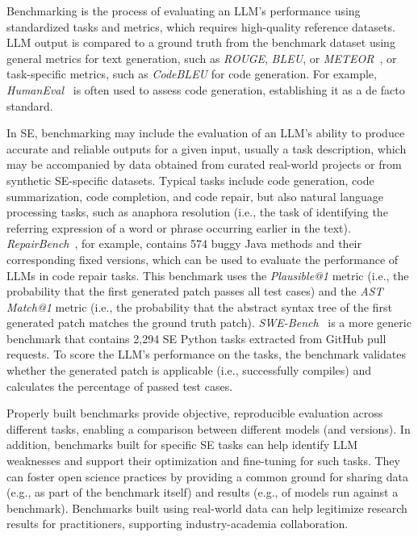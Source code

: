 \label{sec:benchmarking-llms-for-software-engineering-tasks}


Benchmarking is the process of evaluating an LLM's performance using standardized tasks and metrics, which requires high-quality reference datasets.
LLM output is compared to a ground truth from the benchmark dataset using general metrics for text generation, such as \emph{ROUGE}, \emph{BLEU}, or \emph{METEOR}~\cite{10.1145/3695988}, or task-specific metrics, such as \emph{CodeBLEU} for code generation.
For example, \emph{HumanEval}~\cite{DBLP:journals/corr/abs-2107-03374} is often used to assess code generation, establishing it as a de facto standard.


In SE, benchmarking may include the evaluation of an LLM's ability to produce accurate and reliable outputs for a given input, usually a task description, which may be accompanied by data obtained from curated real-world projects or from synthetic SE-specific datasets.
Typical tasks include code generation, code summarization, code completion, and code repair, but also natural language processing tasks, such as anaphora resolution (i.e., the task of identifying the referring expression of a word or phrase occurring earlier in the text). %
\emph{RepairBench}~\cite{silva2024repairbench}, for example, contains 574 buggy Java methods and their corresponding fixed versions, which can be used to evaluate the performance of LLMs in code repair tasks.
This benchmark uses the \emph{Plausible@1} metric (i.e., the probability that the first generated patch passes all test cases) and the \emph{AST Match@1} metric (i.e., the probability that the abstract syntax tree of the first generated patch matches the ground truth patch).
\emph{SWE-Bench}~\cite{DBLP:conf/iclr/JimenezYWYPPN24} is a more generic benchmark that contains 2,294 SE Python tasks extracted from GitHub pull requests.
To score the LLM's performance on the tasks, the benchmark validates whether the generated patch is applicable (i.e., successfully compiles) and calculates the percentage of passed test cases.


Properly built benchmarks provide objective, reproducible evaluation across different tasks, enabling a comparison between different models (and versions).
In addition, benchmarks built for specific SE tasks can help identify LLM weaknesses and support their optimization and fine-tuning for such tasks.
They can foster open science practices by providing a common ground for sharing data (e.g., as part of the benchmark itself) and results (e.g., of models run against a benchmark).
Benchmarks built using real-world data can help legitimize research results for practitioners, supporting industry-academia collaboration.


